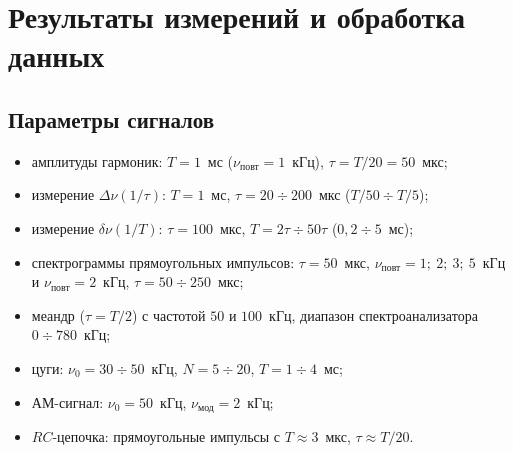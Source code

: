 \documentclass[a4paper,12pt]{article}
\begin{document}
\section{Результаты измерений и обработка данных}

\subsection{Параметры сигналов}
\begin{itemize}
    \item амплитуды гармоник: $T = 1$~мс ($\nu_{\text{повт}} = 1$~кГц),
          $\tau = T/20 = 50$~мкс;
    \item измерение $\Delta\nu(1/\tau)$: $T = 1$~мс,
          $\tau = 20\div200$~мкс ($T/50\div T/5$);
    \item измерение $\delta\nu(1/T)$: $\tau = 100$~мкс,
          $T = 2\tau\div50\tau$ ($0{,}2\div5$~мс);
    \item спектрограммы прямоугольных импульсов: $\tau = 50$~мкс,
          $\nu_{\text{повт}} = 1;\ 2;\ 3;\ 5$~кГц и $\nu_{\text{повт}} = 2$~кГц,
          $\tau = 50\div250$~мкс;
    \item меандр ($\tau = T/2$) с частотой $50$ и $100$~кГц,
          диапазон спектроанализатора $0\div780$~кГц;
    \item цуги: $\nu_0 = 30\div50$~кГц, $N = 5\div20$,
          $T = 1\div4$~мс;
    \item АМ-сигнал: $\nu_0 = 50$~кГц, $\nu_{\text{мод}} = 2$~кГц;
    \item $RC$-цепочка: прямоугольные импульсы с $T \approx 3$~мкс,
          $\tau \approx T/20$.
\end{itemize}
\end{document}
